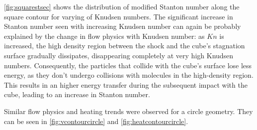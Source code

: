 \autoref{fig:squarestsec} shows the distribution of modified Stanton number along the square contour for varying of Knudsen numbers. The significant increase in Stanton number seen with increasing Knudsen number can again be probably explained by the change in flow physics with Knudsen number: as $Kn$ is increased, the high density region between the shock and the cube's stagnation surface gradually dissipates, disappearing completely at very high Knudsen numbers. Consequently, the particles that collide with the cube's surface lose less energy, as they don't undergo collisions with molecules in the high-density region. This results in an higher energy transfer during the subsequent impact with the cube, leading to an increase in Stanton number.


Similar flow physics and heating trends were observed for a circle geometry. They can be seen in \autoref{fig:vcontourcircle} and \autoref{fig:heatcontourcircle}. 


